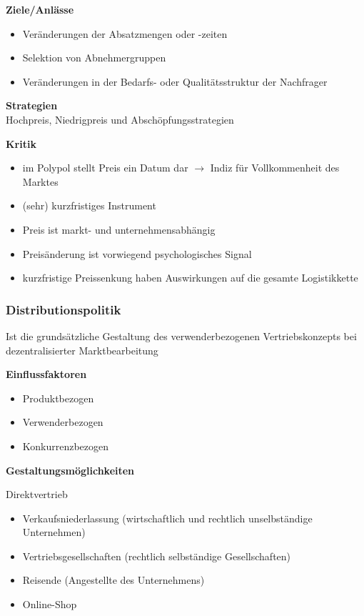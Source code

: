 \documentclass[a4paper,11pt, twoside]{article}
\begin{document}
\textbf{Ziele/Anlässe}
\begin{itemize}
	\item Veränderungen der Absatzmengen oder -zeiten
	\item Selektion von Abnehmergruppen
	\item Veränderungen in der Bedarfs- oder Qualitätsstruktur der Nachfrager 
\end{itemize}

\textbf{Strategien}\\
Hochpreis, Niedrigpreis und Abschöpfungsstrategien

\textbf{Kritik}
\begin{itemize}
	\item im Polypol stellt Preis ein Datum dar $\rightarrow$ Indiz für Vollkommenheit des Marktes
	\item (sehr) kurzfristiges Instrument
	\item Preis ist markt- und unternehmensabhängig 
	\item Preisänderung ist vorwiegend psychologisches Signal
	\item kurzfristige Preissenkung haben Auswirkungen auf die gesamte Logistikkette
\end{itemize}

\subsubsection{Distributionspolitik}
Ist die grundsätzliche Gestaltung des verwenderbezogenen Vertriebskonzepts bei dezentralisierter Marktbearbeitung

\textbf{Einflussfaktoren}
\begin{itemize}
	\item Produktbezogen
	\item Verwenderbezogen
	\item Konkurrenzbezogen
\end{itemize}

\textbf{Gestaltungsmöglichkeiten}

Direktvertrieb
\begin{itemize}
	\item Verkaufsniederlassung (wirtschaftlich und rechtlich unselbständige Unternehmen)
	\item Vertriebsgesellschaften (rechtlich selbständige Gesellschaften)
	\item Reisende (Angestellte des Unternehmens)
	\item Online-Shop
\end{itemize}
\end{document}
